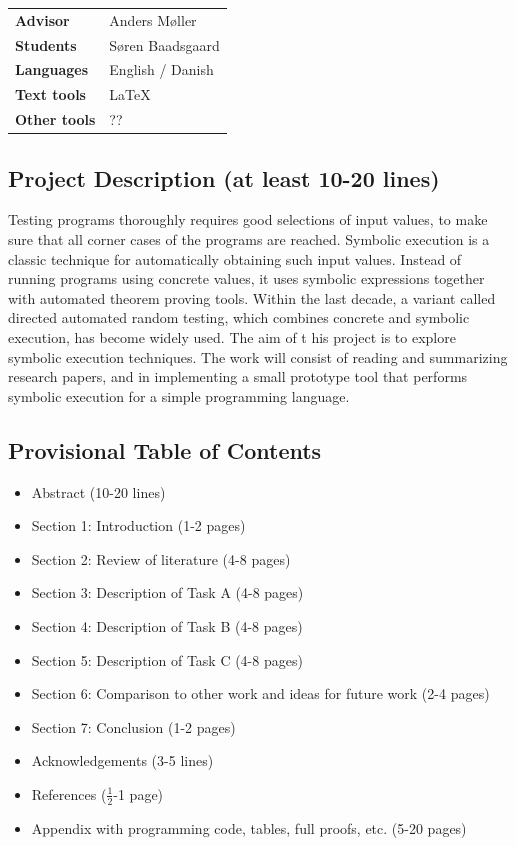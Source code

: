 \documentclass{article}
\begin{document}
\pagestyle{fancy}

\bgroup{}
\begin{table}[h]
\begin{tabular}{ll}
\textbf{Advisor}     & Anders Møller    \\
\textbf{Students}    & Søren Baadsgaard \\
\textbf{Languages}   & English / Danish \\
\textbf{Text tools}  & \LaTeX         \\
\textbf{Other tools} & ??              
\end{tabular}
\end{table}
\egroup\vspace{-0.cm}

\subsection*{Project Description (at least 10-20 lines)}
Testing programs thoroughly requires good selections of input values, to make sure that all corner 
cases of the programs are reached. Symbolic execution is a classic technique for automatically 
obtaining such input values. Instead of running programs using
concrete values, it uses symbolic 
expressions together with automated theorem proving tools. Within the last decade, a variant 
called directed automated random testing, which combines concrete and symbolic execution, has 
become widely used.
The aim of t
his project is to explore symbolic execution techniques. The work will consist of 
reading and summarizing research papers, and in implementing a small prototype tool that 
performs symbolic execution for a simple programming language.

\subsection*{Provisional Table of Contents}
\begin{itemize}
    \item Abstract (10-20 lines)
    \item Section 1: Introduction (1-2 pages)
    \item Section 2: Review of literature (4-8 pages)
    \item Section 3: Description of Task A (4-8 pages)
    \item Section 4: Description of Task B (4-8 pages)
    \item Section 5: Description of Task C (4-8 pages)
    \item Section 6: Comparison to other work and ideas for future work (2-4 pages)
    \item Section 7: Conclusion (1-2 pages)
    \item Acknowledgements (3-5 lines)
    \item References ($\frac{1}{2}$-1 page)
    \item Appendix with programming code, tables, full proofs, etc. (5-20 pages)
\end{itemize}
\end{document}
